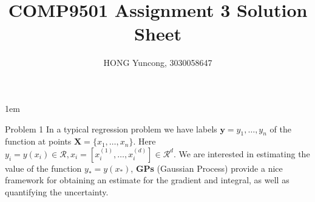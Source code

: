 \documentclass{article}
\newcounter{pcounter}                                   %
\newcommand{\domR}{\mathcal{R}}                         %
\begin{document}
    \parindent 0in
    \parskip 1em
    \title{COMP9501 Assignment 3 Solution Sheet}
    \author{HONG Yuncong, 3030058647}
    \maketitle

    \begin{section}{Problem 1}
        \setcounter{pcounter}{0}
        In a typical regression problem we have labels $\mathbf{y} = y_1, \dots, y_n$ of the function at points $\mathbf{X} = \{x_1, \dots, x_n\}$. Here $y_i=y(x_i) \in \domR, x_i = [x_i^{(1)}, \dots, x_i^{(d)}] \in \domR^{d}$. We are interested in estimating the value of the function $y_* = y(x_*)$, 
        \textbf{GPs} (Gaussian Process) provide a nice framework for obtaining an estimate for the gradient and integral, as well as quantifying the uncertainty.


\end{section}
\end{document}
